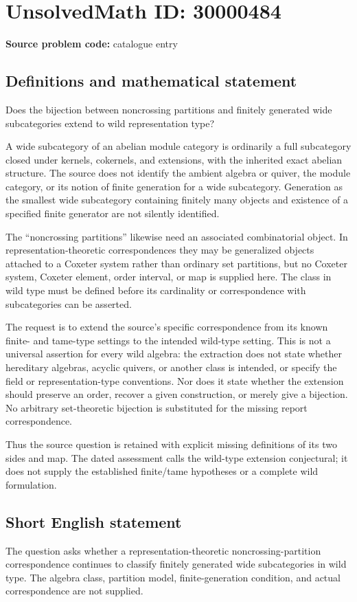 \documentclass[11pt]{article}
\begin{document}
\section*{UnsolvedMath ID: 30000484}
\textbf{Source problem code:} catalogue entry
\subsection{Definitions and mathematical statement}
Does the bijection between noncrossing partitions and finitely generated wide subcategories extend to wild representation type?

A wide subcategory of an abelian module category is ordinarily a full subcategory closed under kernels, cokernels, and extensions, with the inherited exact abelian structure. The source does not identify the ambient algebra or quiver, the module category, or its notion of finite generation for a wide subcategory. Generation as the smallest wide subcategory containing finitely many objects and existence of a specified finite generator are not silently identified.

The ``noncrossing partitions'' likewise need an associated combinatorial object. In representation-theoretic correspondences they may be generalized objects attached to a Coxeter system rather than ordinary set partitions, but no Coxeter system, Coxeter element, order interval, or map is supplied here. The class in wild type must be defined before its cardinality or correspondence with subcategories can be asserted.

The request is to extend the source's specific correspondence from its known finite- and tame-type settings to the intended wild-type setting. This is not a universal assertion for every wild algebra: the extraction does not state whether hereditary algebras, acyclic quivers, or another class is intended, or specify the field or representation-type conventions. Nor does it state whether the extension should preserve an order, recover a given construction, or merely give a bijection. No arbitrary set-theoretic bijection is substituted for the missing report correspondence.

Thus the source question is retained with explicit missing definitions of its two sides and map. The dated assessment calls the wild-type extension conjectural; it does not supply the established finite/tame hypotheses or a complete wild formulation.
\subsection{Short English statement}
The question asks whether a representation-theoretic noncrossing-partition correspondence continues to classify finitely generated wide subcategories in wild type. The algebra class, partition model, finite-generation condition, and actual correspondence are not supplied.
\end{document}
